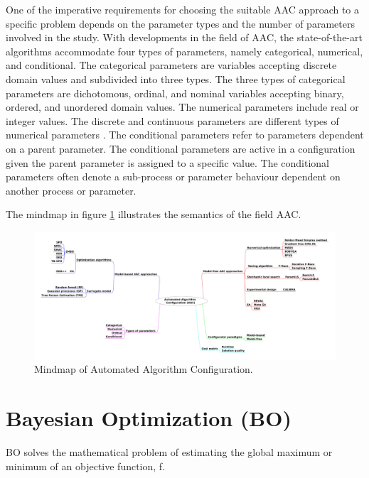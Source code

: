 One of the imperative requirements for choosing the suitable AAC approach to a specific problem depends on the parameter types and the number of parameters involved in the study. With developments in the field of AAC, the state-of-the-art algorithms accommodate four types of parameters, namely categorical, numerical, and conditional. The categorical parameters are variables accepting discrete domain values and subdivided into three types. The three types of categorical parameters are dichotomous, ordinal, and nominal variables accepting binary, ordered, and unordered domain values. The numerical parameters include real or integer values. The discrete and continuous parameters are different types of numerical parameters \cite{parameter_types}. The conditional parameters refer to parameters dependent on a parent parameter. The conditional parameters are active in a configuration given the parent parameter is assigned to a specific value. The conditional parameters often denote a sub-process or parameter behaviour dependent on another process or parameter. 

The mindmap in figure \ref{fig:AAC_mindmap} illustrates the semantics of the field AAC.
 
\label{section:AAC-mindmap}

\begin{figure}[!ht]
\centering
\includegraphics[width=\textwidth]{images/AAC_mindmap1.jpg}
\captionsetup{justification=justified}
\caption[Mindmap of Automated Algorithm Configuration]{Mindmap of Automated Algorithm Configuration.}
\label{fig:AAC_mindmap}
\end{figure}


\section{Bayesian Optimization (BO)}
\label{section:bayesianoptimization}

BO solves the mathematical problem of estimating the global maximum or minimum of an objective function, f. 

